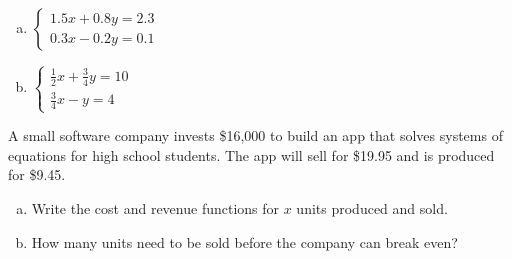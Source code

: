 \documentclass{exam}
\begin{document}
\begin{questions}
\begin{multicols}{2}
\begin{enumerate}[a.]
\item
$
\begin{cases}
1.5x + 0.8y = 2.3\\
0.3x - 0.2y = 0.1
\end{cases}
$

\item

$
\begin{cases}
\frac{1}{2}x + \frac{3}{4}y = 10 \\
\frac{3}{4}x - y = 4
\end{cases}
$
\end{enumerate}
\end{multicols}

\question
A small software company invests \$16,000 to build an app that solves systems of equations for high school students.  The app will sell for \$19.95 and is produced for \$9.45.

\begin{enumerate}[a.]
\item Write the cost and revenue functions for $x$ units produced and sold.
\item How many units need to be sold before the company can break even?
\end{enumerate}
\end{questions}
\end{document}
